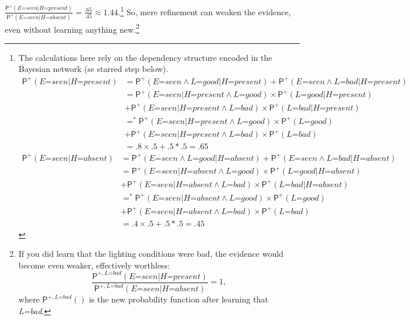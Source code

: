 \documentclass[
  11pt,
  dvipsnames,enabledeprecatedfontcommands]{scrartcl}
\newcommand{\ppr}[2]{\ensuremath{\mathsf{P}^{#1}(#2)}}
\begin{document}
\(\frac{\ppr{+}{\textit{E=seen} \vert \textit{H=present}}}{\ppr{+}{\textit{E=seen} \vert \textit{H=absent}}}=\frac{.65}{.45}\approx 1.44\).\footnote{The
  calculations here rely on the dependency structure encoded in the
  Bayesian network (se starred step below). \begin{align*}
  \ppr{+}{\textit{E=seen} \vert \textit{H=present}} &= \ppr{+}{\textit{E=seen} \wedge \textit{L=good} \vert \textit{H=present}}+\ppr{+}{\textit{E=seen} \wedge \textit{L=bad} \vert \textit{H=present}}\\
  &= \ppr{+}{\textit{E=seen} \vert \textit{H=present} \wedge \textit{L=good}}  \times \ppr{+}{\textit{L=good} \vert  \textit{H=present} }\\ & +\ppr{+}{\textit{E=seen}  \vert \textit{H=present} \wedge \textit{L=bad}} \times \ppr{+}{\textit{L=bad} \vert  \textit{H=present}}\\
  &=^* \ppr{+}{\textit{E=seen} \vert \textit{H=present} \wedge \textit{L=good}}  \times \ppr{+}{\textit{L=good}}\\ & +\ppr{+}{\textit{E=seen}  \vert \textit{H=present} \wedge \textit{L=bad}} \times \ppr{+}{\textit{L=bad}}\\
  &= .8 \times .5 +.5 *.5 = .65 
  \end{align*} \begin{align*}
  \ppr{+}{\textit{E=seen} \vert \textit{H=absent}} &= \ppr{+}{\textit{E=seen} \wedge \textit{L=good} \vert \textit{H=absent}}+\ppr{+}{\textit{E=seen} \wedge \textit{L=bad} \vert \textit{H=absent}}\\
  &= \ppr{+}{\textit{E=seen} \vert \textit{H=absent} \wedge \textit{L=good}}  \times \ppr{+}{\textit{L=good} \vert  \textit{H=absent} }\\ & +\ppr{+}{\textit{E=seen}  \vert \textit{H=absent} \wedge \textit{L=bad}} \times \ppr{+}{\textit{L=bad} \vert  \textit{H=absent}}\\
  &=^* \ppr{+}{\textit{E=seen} \vert \textit{H=absent} \wedge \textit{L=good}}  \times \ppr{+}{\textit{L=good}}\\ & +\ppr{+}{\textit{E=seen}  \vert \textit{H=absent} \wedge \textit{L=bad}} \times \ppr{+}{\textit{L=bad}}\\
  &= .4 \times .5 +.5 *.5 = .45 
  \end{align*}} So, mere
refinement can weaken the evidence, even without learning anything
new.\footnote{If you did learn that the lighting conditions were bad,
  the evidence would become even weaker, effectively worthless:
  \[\frac{\ppr{+, \textit{L=bad}}{\textit{E=seen} \vert \textit{H=present}}}{\ppr{+, \textit{L=bad}}{\textit{E=seen} \vert \textit{H=absent}}}=1,\]
  where \(\ppr{+, \textit{L=bad}}{}\) is the new probability function
  after learning that \textit{L=bad}.}
\end{document}
